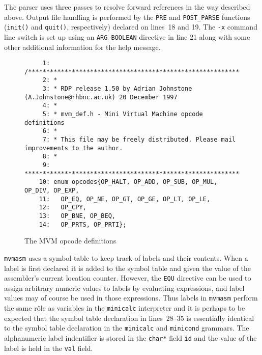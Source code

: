 The parser uses three passes to resolve forward references in the way
described above. Output file handling is performed by the {\tt PRE} and
\verb+POST_PARSE+ functions (\verb+init()+ and \verb+quit()+,
respectively) declared on lines~18 and 19. The \verb+-x+ command line
switch is set up using an \verb+ARG_BOOLEAN+ directive in line 21 along
with some other additional information for the help message.
\begin{figure}
\hspace*{-1cm}
\begin{minipage}{30cm}
\footnotesize
\begin{verbatim}
     1: /*******************************************************************************
     2: *
     3: * RDP release 1.50 by Adrian Johnstone (A.Johnstone@rhbnc.ac.uk) 20 December 1997
     4: *
     5: * mvm_def.h - Mini Virtual Machine opcode definitions
     6: *
     7: * This file may be freely distributed. Please mail improvements to the author.
     8: *
     9: *******************************************************************************/
    10: enum opcodes{OP_HALT, OP_ADD, OP_SUB, OP_MUL, OP_DIV, OP_EXP, 
    11:   OP_EQ, OP_NE, OP_GT, OP_GE, OP_LT, OP_LE, 
    12:   OP_CPY, 
    13:   OP_BNE, OP_BEQ, 
    14:   OP_PRTS, OP_PRTI}; 
\end{verbatim}
\end{minipage}
\caption{The MVM opcode definitions}
\label{mvm_def.h}
\end{figure}

{\tt mvmasm} uses a symbol table to keep track of labels and their contents. 
When a label is first declared it is added to the symbol table and given the value
of the assembler's current location counter. However, the {\tt EQU} directive can be
used to assign arbitrary numeric values to labels by evaluating expressions, and label
values may of course be used in those expressions. Thus labels in {\tt mvmasm} perform the
same r\^ole as variables in the {\tt minicalc} interpreter and it is perhaps to be expected
that the symbol table declaration in lines~28--35 is essentially identical to the
symbol table declaration in the {\tt minicalc} and {\tt minicond} grammars. The alphanumeric
label indentifier is stored in the {\tt char*} field {\tt id} and the value of the label
is held in the {\tt val} field.

